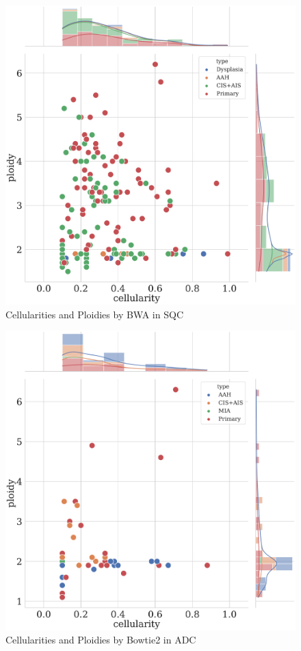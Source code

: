 \documentclass[11pt,a4paper,onecolumn,oneside]{report}
\begin{document}
                \begin{figure}[p]
                    \centering
                    \includegraphics[width=0.6 \linewidth]{figures/Sequenza/BWA-sequenza-SQC.pdf}
                    \caption{Cellularities and Ploidies by BWA in SQC}
                    \label{fig:sequenza-BWA-SQC}
                \end{figure}

                \begin{figure}[p]
                    \centering
                    \includegraphics[width=0.6 \linewidth]{figures/Sequenza/Bowtie2-sequenza-ADC.pdf}
                    \caption{Cellularities and Ploidies by Bowtie2 in ADC}
                    \label{fig:sequenza-Bowtie2-ADC}
                \end{figure}
\end{document}
